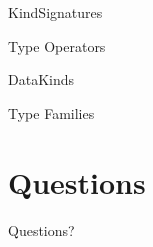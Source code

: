 \documentclass[xcolor={usenames,dvipsnames}]{beamer}
\begin{document}
\begin{frame}[fragile]{KindSignatures}
\end{frame}

\begin{frame}[fragile]{Type Operators}
\end{frame}

\begin{frame}[fragile]{DataKinds}
\end{frame}

\begin{frame}[fragile]{Type Families}
\end{frame}


\section{Questions}

\begin{frame}
  Questions?
\end{frame}
\end{document}
